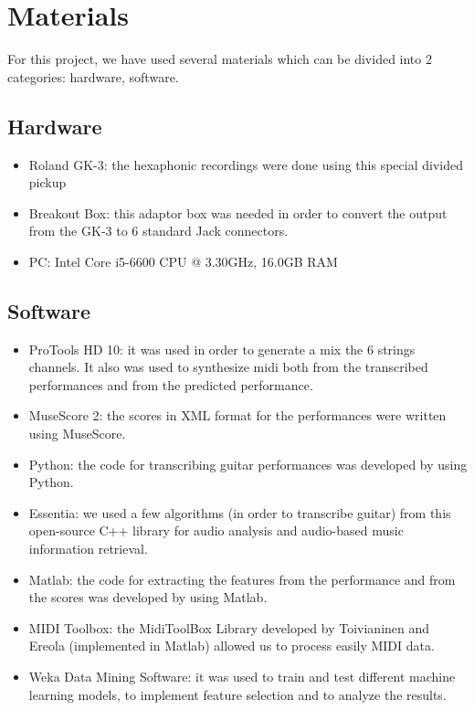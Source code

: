 \chapter{Materials}
\label{chap:materials}
For this project, we have used several materials which can be divided into 2 categories: hardware, software.

\section*{Hardware}
\begin{itemize}[noitemsep]
\item Roland GK-3: the hexaphonic recordings were done using this special divided pickup
\item Breakout Box: this adaptor box was needed in order to convert the output from the GK-3 to 6 standard Jack connectors.
\item PC: Intel Core i5-6600 CPU @ 3.30GHz, 16.0GB RAM
\end{itemize}

\section*{Software}
\begin{itemize}[noitemsep]
\item ProTools HD 10: it was used in order to generate a mix the 6 strings channels. It also was used to synthesize midi both from the transcribed performances and from the predicted performance.
\item MuseScore 2: the scores in XML format for the performances were written using MuseScore.
\item Python: the code for transcribing guitar performances was developed by using Python.
\item Essentia: we used a few algorithms (in order to transcribe guitar) from this open-source C++ library for audio analysis and audio-based music information retrieval.
\item Matlab: the code for extracting the features from the performance and from the scores was developed by using Matlab.
\item MIDI Toolbox: the MidiToolBox Library developed by Toivianinen and Ereola (implemented in Matlab) allowed us to process easily MIDI data.
\item Weka Data Mining Software: it was used to train and test different machine learning models, to implement feature selection and to analyze the results.
\end{itemize}

\cleardoublepage